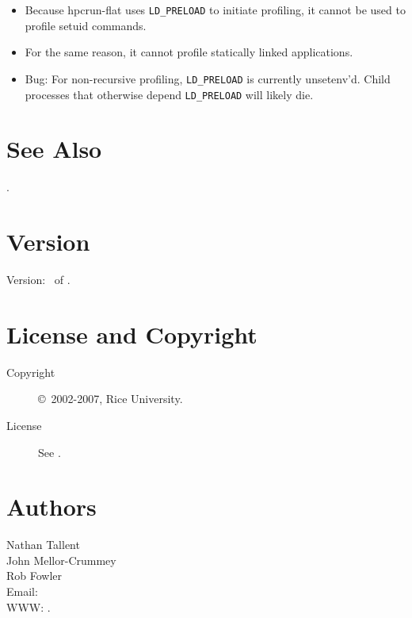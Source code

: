 \documentclass[english]{article}
\begin{document}
\begin{itemize}
  \item Because hpcrun-flat uses \verb+LD_PRELOAD+ to initiate profiling, it cannot be used to profile setuid commands.
  \item For the same reason, it cannot profile statically linked applications.
  \item Bug: For non-recursive profiling, \verb+LD_PRELOAD+ is currently unsetenv'd.  Child processes that otherwise depend \verb+LD_PRELOAD+ will likely die.
\end{itemize}


\section{See Also}

.

\section{Version}

Version: \Version\ of \Date.

\section{License and Copyright}

\begin{description}
\item[Copyright] \copyright\ 2002-2007, Rice University.
\item[License] See .
\end{description}

\section{Authors}

\noindent
Nathan Tallent \\
John Mellor-Crummey \\
Rob Fowler \\
Email:  \\
WWW: .

\LatexManEnd
\end{document}
